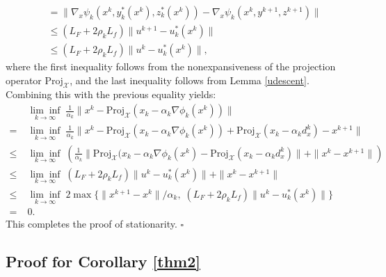 \documentclass{article}
\newenvironment{proof}[1][Proof]{\par
	\normalfont\topsep6pt\relax
	\trivlist\item[\hskip\labelsep\itshape #1.]\ignorespaces
}{%
	\hfill\ensuremath{\square}\endtrivlist
}
\def\x{x}
\begin{document}
\begin{proof}[Proof of Theorem \ref{thm1}]
\[\begin{aligned}
        & =  \| \nabla_x\psi_{k}(x^k,y_{k}^*(x^k),z_{k}^*(x^k)) - \nabla_x\psi_{k}(x^k,y^{k+1},z^{k+1}) \| \\
        &\le(L_F + 2\rho_k L_f)\| u^{k+1}- u_{k}^*(x^k)\| \\
        & \le (L_F + 2\rho_k L_f)\| u^{k}- u_{k}^*(x^k)\|,
    \end{aligned}
    \]
where the first inequality follows from the nonexpansiveness of the projection operator $\mathrm{Proj}_{\mathcal{X}}$, and the last inequality follows from Lemma \ref{udescent}. 
Combining this with the previous equality yields:
\begin{align*}
    &\underset{k \rightarrow \infty}{\lim\inf}\;\frac{1}{\alpha_k}\| x^k - \mathrm{Proj}_{\mathcal{X}}(\x_k-\alpha_k \nabla\phi_{k}(x^k))\| \\
    =\;&\underset{k \rightarrow \infty}{\lim\inf}\;\frac{1}{\alpha_k}\| x^k - \mathrm{Proj}_{\mathcal{X}}(\x_k-\alpha_k \nabla\phi_{k}(x^k))+\mathrm{Proj}_{\mathcal{X}}(\x_k-\alpha_k  d_{\x}^k)-x^{k+1}\|\\
    \le\;&\underset{k \rightarrow \infty}{\lim\inf}\;\left(\frac{1}{\alpha_k}\| \mathrm{Proj}_{\mathcal{X}}(\x_k-\alpha_k \nabla\phi_{k}(x^k) -\mathrm{Proj}_{\mathcal{X}}(\x_k-\alpha_k d_{\x}^k)\|+\|x^k-x^{k+1}\|\right)\\
    \le\;&\underset{k \rightarrow \infty}{\lim\inf}\;(L_F + 2\rho_k L_f)\| u^{k}- u_{k}^*(x^k)\|+\|x^k-x^{k+1}\|\\
    \le\;&\underset{k \rightarrow \infty}{\lim\inf}\;2\max\{\|x^{k+1}-x^{k}\|/\alpha_k,\;(L_F+2\rho_kL_f)\| u^{k}-u_{k}^*(x^{k}) \|\}
    \\
=\;&  0.
\end{align*}
This completes the proof of stationarity.
\end{proof}


\subsection{Proof for Corollary \ref{thm2}}
\end{document}

